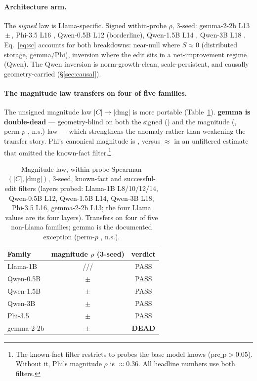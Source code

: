 \paragraph{Architecture arm.} The \emph{signed} law is Llama-specific. Signed
within-probe $\rho$, 3-seed: gemma-2-2b L13 \gemmaSigned{}\,$\pm$\,\gemmaSignedSD{},
Phi-3.5 L16 \phiSigned{}, Qwen-0.5B L12 \qwenHalfSigned{} (borderline),
Qwen-1.5B L14 \qwenFifteenSigned{}, Qwen-3B L18 \qwenThreeSigned{}. Eq.~\ref{eq:sc}
accounts for both breakdowns: near-null where $S\approx 0$ (distributed
storage, gemma/Phi), inversion where the edit sits in a net-improvement regime
(Qwen). The Qwen inversion is norm-growth-clean, scale-persistent, and
causally geometry-carried (\S\ref{sec:causal}).

\paragraph{The magnitude law transfers on four of five families.} The
unsigned magnitude law $|C|\rightarrow|\text{dmg}|$ is more portable
(Table~\ref{tab:magnitude}). \textbf{gemma is double-dead} --- geometry-blind
on both the signed (\gemmaSigned{}) and the magnitude
(\magGemma{}, perm-$p$ \magGemmaPermP{}, n.s.) law --- which strengthens the
anomaly rather than weakening the transfer story. Phi's canonical magnitude is
\magPhi{}, versus $\approx$\magPhiPeek{} in an unfiltered estimate that omitted
the known-fact filter.\footnote{The known-fact filter restricts to
probes the base model knows ($\text{pre\_p}>0.05$). Without it, Phi's magnitude
$\rho$ is $\approx$0.36. All headline numbers use both filters.}

\begin{table}[t]
\centering\small
\setlength{\tabcolsep}{3pt}
\begin{tabular}{@{}lcc@{}}
\toprule
Family & magnitude $\rho$ (3-seed) & verdict \\
\midrule
Llama-1B  & \magLlamaLeight{}/\magLlamaLten{}/\textbf{\magLlamaLtwelve{}}/\magLlamaLfourteen{} & PASS \\
Qwen-0.5B & \magQwenHalf{}\,$\pm$\,\magQwenHalfSD{} & PASS \\
Qwen-1.5B & \magQwenFifteen{}\,$\pm$\,\magQwenFifteenSD{} & PASS \\
Qwen-3B   & \magQwenThree{}\,$\pm$\,\magQwenThreeSD{}   & PASS \\
Phi-3.5   & \magPhi{}\,$\pm$\,\magPhiSD{}   & PASS \\
gemma-2-2b & \magGemma{}\,$\pm$\,\magGemmaSD{} & \textbf{DEAD} \\
\bottomrule
\end{tabular}
\caption{Magnitude law, within-probe Spearman$(|C|,|\text{dmg}|)$, 3-seed,
known-fact and successful-edit filters (layers probed: Llama-1B L8/10/12/14, Qwen-0.5B L12,
Qwen-1.5B L14, Qwen-3B L18, Phi-3.5 L16, gemma-2-2b L13; the four Llama values
are its four layers). Transfers on four of five non-Llama families; gemma is the
documented exception (perm-$p$ \magGemmaPermP{}, n.s.).}
\label{tab:magnitude}
\end{table}


